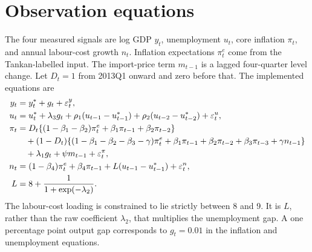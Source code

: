 \documentclass[11pt,a4paper]{article}
\newcommand{\NAIRU}{u^{*}}
\newcommand{\gap}{g}
\newcommand{\eps}{\varepsilon}
\begin{document}
\section{Observation equations}
The four measured signals are log GDP $y_t$, unemployment $u_t$, core
inflation $\pi_t$, and annual labour-cost growth $n_t$. Inflation
expectations $\pi_t^e$ come from the Tankan-labelled input. The import-price
term $m_{t-1}$ is a lagged four-quarter level change. Let $D_t=1$ from
2013Q1 onward and zero before that. The implemented equations are
\begin{align}
 y_t &= y_t^*+\gap_t+\eps^y_t,\\
 u_t &= \NAIRU_t+\lambda_3\gap_t
       +\rho_1(u_{t-1}-\NAIRU_{t-1})
       +\rho_2(u_{t-2}-\NAIRU_{t-2})+\eps^u_t,\\
 \pi_t &= D_t\{(1-\beta_1-\beta_2)\pi_t^e
                 +\beta_1\pi_{t-1}+\beta_2\pi_{t-2}\}\notag\\
 &\quad +(1-D_t)\{(1-\beta_1-\beta_2-\beta_3-\gamma)\pi_t^e
          +\beta_1\pi_{t-1}+\beta_2\pi_{t-2}
          +\beta_3\pi_{t-3}+\gamma n_{t-1}\}\notag\\
 &\quad +\lambda_1\gap_t+\psi m_{t-1}+\eps^\pi_t,\\
 n_t &= (1-\beta_4)\pi_t^e+\beta_4\pi_{t-1}
       +L(u_{t-1}-\NAIRU_{t-1})+\eps^n_t,\\
 L &= 8+\frac{1}{1+\exp(-\lambda_2)}.
\end{align}
The labour-cost loading is constrained to lie strictly between 8 and 9.
It is $L$, rather than the raw coefficient $\lambda_2$, that multiplies the
unemployment gap. A one percentage point output gap corresponds to
$\gap_t=0.01$ in the inflation and unemployment equations.
\end{document}
